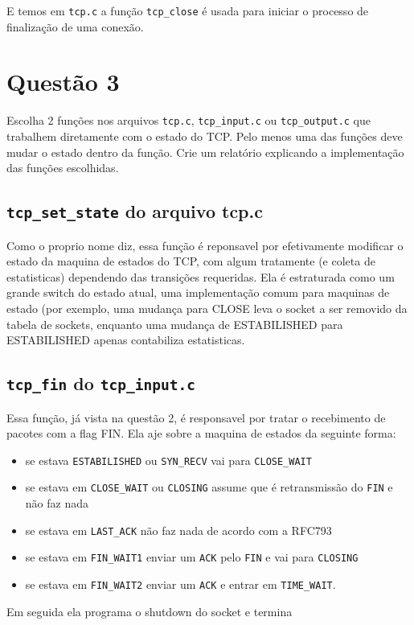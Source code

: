 \documentclass[11pt]{article}
\begin{document}
E temos em \texttt{tcp.c} a função \texttt{tcp\_close} é usada para iniciar o
processo de finalização de uma conexão.

\section{Questão 3}
\label{sec-3}
Escolha 2 funções nos arquivos \texttt{tcp.c}, \texttt{tcp\_input.c} ou
\texttt{tcp\_output.c} que trabalhem diretamente com o estado do TCP. Pelo
menos uma das funções deve mudar o estado dentro da função. Crie
um relatório explicando a implementação das funções escolhidas.

\subsection{\texttt{tcp\_set\_state} do arquivo tcp.c}
\label{sec-3-1}
Como o proprio nome diz, essa função é reponsavel por
efetivamente modificar o estado da maquina de estados do TCP, com
algum tratamente (e coleta de estatisticas) dependendo das
transições requeridas.
Ela é estraturada como um grande switch do estado atual, uma
implementação comum para maquinas de estado (por exemplo, uma mudança
para CLOSE leva o socket a ser removido da tabela de sockets, enquanto
uma mudança de ESTABILISHED para ESTABILISHED apenas contabiliza
estatisticas.

\subsection{\texttt{tcp\_fin} do \texttt{tcp\_input.c}}
\label{sec-3-2}
Essa função, já vista na questão 2, é responsavel por tratar o
recebimento de pacotes com a flag FIN.
Ela aje sobre a maquina de estados da seguinte forma:

\begin{itemize}
\item se estava \texttt{ESTABILISHED} ou \texttt{SYN\_RECV} vai para \texttt{CLOSE\_WAIT}

\item se estava em \texttt{CLOSE\_WAIT} ou \texttt{CLOSING} assume que é
retransmissão do \texttt{FIN} e não faz nada

\item se estava em \texttt{LAST\_ACK} não faz nada de acordo com a RFC793

\item se estava em \texttt{FIN\_WAIT1} enviar um \texttt{ACK} pelo \texttt{FIN} e vai para \texttt{CLOSING}

\item se estava em \texttt{FIN\_WAIT2} enviar um \texttt{ACK} e entrar em \texttt{TIME\_WAIT}.
\end{itemize}

Em seguida ela programa o shutdown do socket e termina
\end{document}
